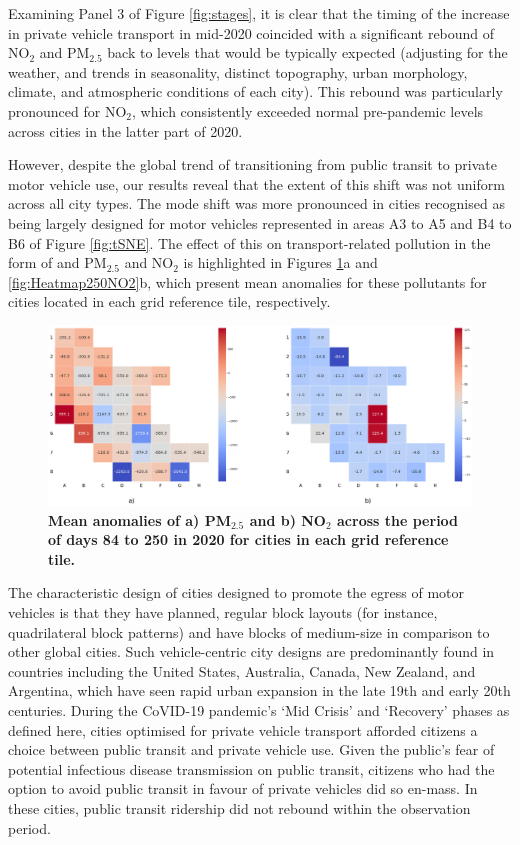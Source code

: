 \documentclass[preprint,12pt]{elsarticle}
\begin{document}
Examining Panel 3 of Figure \ref{fig:stages}, it is clear that the timing of the increase in private vehicle transport in mid-2020 coincided with a significant rebound of NO$_{2}$ and PM$_{2.5}$ back to levels that would be typically expected (adjusting for the weather, and trends in seasonality, distinct topography, urban morphology, climate, and atmospheric conditions of each city\cite{Wijnands2022}). This rebound was particularly pronounced for NO$_{2}$, which consistently exceeded normal pre-pandemic levels across cities in the latter part of 2020.

However, despite the global trend of transitioning from public transit to private motor vehicle use\cite{fernando2023shaping}, our results reveal that the extent of this shift was not uniform across all city types. The mode shift  was more pronounced in cities recognised as being largely designed for motor vehicles\cite{Thompson2020} represented in areas A3 to A5 and B4 to B6 of Figure \ref{fig:tSNE}. The effect of this on transport-related pollution in the form of and PM$_{2.5}$ and NO$_{2}$ is highlighted in Figures \ref{fig:Heatmap250PM}a and \ref{fig:Heatmap250NO2}b, which present mean anomalies for these pollutants for cities located in each grid reference tile, respectively.

\begin{figure}
\centering
\includegraphics[trim={0 0 0 0},clip,scale=0.25]{Images/pm25Anomaly250_no2Reduction7Ave7Ave250.png}
\caption{\bf Mean anomalies of a) PM$_{2.5}$ and b) NO$_{2}$ across the period of days 84 to 250 in 2020 for cities in each grid reference tile.}  
 \label{fig:Heatmap250NO2}\label{fig:Heatmap250PM}
\end{figure}

The characteristic design of cities designed to promote the egress of motor vehicles is that they have planned, regular block layouts (for instance, quadrilateral block patterns) and have blocks of medium-size in comparison to other global cities\cite{Thompson2020}. Such vehicle-centric city designs are predominantly found in countries including the United States, Australia, Canada, New Zealand, and Argentina, which have seen rapid urban expansion in the late 19th and early 20th centuries. During the CoVID-19 pandemic's `Mid Crisis' and `Recovery' phases as defined here, cities optimised for private vehicle transport afforded citizens a choice between public transit and private vehicle use. Given the public's fear of potential infectious disease transmission on public transit\cite{fernando2023shaping}, citizens who had the option to avoid public transit in favour of private vehicles did so en-mass. In these cities, public transit ridership did not rebound within the observation period. 
\end{document}
